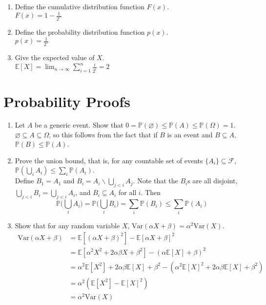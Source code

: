 \documentclass{article}
\newcommand{\PrMe}{\mathbb{P}}
\begin{document}
\begin{enumerate}[label=\arabic*.]
\begin{enumerate}[label=(\alph*)]
	\item Define the cumulative distribution function $F(x)$. \\
		 {\color{blue} $F(x) = 1 - \frac{1}{2^x}$}
	\item Define the probability distribution function $p(x)$. \\
		 {\color{blue} $p(x) = \frac{1}{2^x}$}
	\item Give the expected value of $X$. \\
		 {\color{blue} $\mathbb{E}[X] = \lim_{n \rightarrow \infty} \sum_{i=1}^n \frac{i}{2^i} = 2$}
	\end{enumerate}
\end{enumerate}

\section{Probability Proofs}
\begin{enumerate}[label=\arabic*.]
\item Let $A$ be a generic event. Show that $0 = \PrMe(\varnothing) \leq \PrMe(A) \leq \PrMe(\Omega) = 1$. \\
	 {\color{blue} $\varnothing \subseteq A \subseteq \Omega$, so this follows from the fact that if $B$ is an event and $B \subseteq A$, $\PrMe(B) \leq \PrMe(A)$.}
\item Prove the union bound, that is, for any countable set of events $\{A_i\} \subseteq \mathcal{F}$, $\PrMe(\bigcup_iA_i) \leq \sum_i\PrMe(A_i)$. \\
	 {\color{blue} Define $B_1 = A_1$ and $B_i = A_i \backslash \bigcup_{j < i} A_j$. Note that the $B_i$s are all disjoint, $\bigcup_{j < i} B_i = \bigcup_{j < i} A_i$, and $B_i \subseteq A_i$ for all $i$. Then $$\PrMe\big(\bigcup_i A_i\big) = \PrMe\big(\bigcup_i B_i\big) = \sum_i\PrMe(B_i) \leq \sum_i\PrMe(A_i)$$}
\item Show that for any random variable $X$, $\text{Var}(\alpha X + \beta) = \alpha^2\text{Var}(X)$. \\
 	 {\color{blue} \begin{align*}
	 \text{Var}(\alpha X + \beta) &= \mathbb{E}[(\alpha X + \beta)^2] - \mathbb{E}[\alpha X + \beta]^2 \\
	 &= \mathbb{E}[\alpha^2X^2 + 2\alpha\beta X + \beta^2] - (\alpha\mathbb{E}[X] + \beta)^2 \\
	 &= \alpha^2\mathbb{E}[X^2] + 2\alpha\beta\mathbb{E}[X] + \beta^2 - (\alpha^2\mathbb{E}[X]^2 + 2\alpha\beta\mathbb{E}[X] + \beta^2) \\
	 &= \alpha^2(\mathbb{E}[X^2] - \mathbb{E}[X]^2) \\
	 &= \alpha^2\text{Var}(X)
	 \end{align*}}
\end{enumerate}
\end{document}
